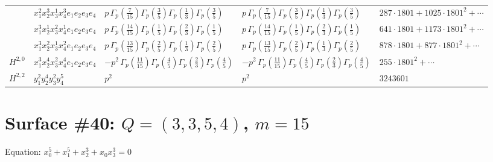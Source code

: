 \documentclass[11pt]{article}
\begin{document}
\begin{table}[ht]
{\begin{tabular}{@{}lllll@{}}
 & $x_{1}^{2} x_{2}^{3} x_{3}^{1} x_{4}^{3}  e_{1} e_{2} e_{3} e_{4}$ & $p \, \Gamma_p \left( \frac{7}{15} \right) \Gamma_p \left( \frac{3}{5} \right) \Gamma_p \left( \frac{1}{3} \right) \Gamma_p \left( \frac{3}{5} \right)$ & $p \, \Gamma_p \left( \frac{7}{15} \right) \Gamma_p \left( \frac{3}{5} \right) \Gamma_p \left( \frac{1}{3} \right) \Gamma_p \left( \frac{3}{5} \right)$ & $287{\cdot}1801{+}1025{\cdot}1801^{2}{+}\cdots$ \\
 & $x_{1}^{3} x_{2}^{1} x_{3}^{2} x_{4}^{1}  e_{1} e_{2} e_{3} e_{4}$ & $p \, \Gamma_p \left( \frac{14}{15} \right) \Gamma_p \left( \frac{1}{5} \right) \Gamma_p \left( \frac{2}{3} \right) \Gamma_p \left( \frac{1}{5} \right)$ & $p \, \Gamma_p \left( \frac{14}{15} \right) \Gamma_p \left( \frac{1}{5} \right) \Gamma_p \left( \frac{2}{3} \right) \Gamma_p \left( \frac{1}{5} \right)$ & $641{\cdot}1801{+}1173{\cdot}1801^{2}{+}\cdots$ \\
 & $x_{1}^{3} x_{2}^{2} x_{3}^{1} x_{4}^{2}  e_{1} e_{2} e_{3} e_{4}$ & $p \, \Gamma_p \left( \frac{13}{15} \right) \Gamma_p \left( \frac{2}{5} \right) \Gamma_p \left( \frac{1}{3} \right) \Gamma_p \left( \frac{2}{5} \right)$ & $p \, \Gamma_p \left( \frac{13}{15} \right) \Gamma_p \left( \frac{2}{5} \right) \Gamma_p \left( \frac{1}{3} \right) \Gamma_p \left( \frac{2}{5} \right)$ & $878{\cdot}1801{+}877{\cdot}1801^{2}{+}\cdots$ \\
\midrule
$H^{2,0}$ & $x_{1}^{3} x_{2}^{4} x_{3}^{2} x_{4}^{4}  e_{1} e_{2} e_{3} e_{4}$ & $- p^{2} \, \Gamma_p \left( \frac{11}{15} \right) \Gamma_p \left( \frac{4}{5} \right) \Gamma_p \left( \frac{2}{3} \right) \Gamma_p \left( \frac{4}{5} \right)$ & $- p^{2} \, \Gamma_p \left( \frac{11}{15} \right) \Gamma_p \left( \frac{4}{5} \right) \Gamma_p \left( \frac{2}{3} \right) \Gamma_p \left( \frac{4}{5} \right)$ & $255{\cdot}1801^{2}{+}\cdots$ \\
\midrule
$H^{2,2}$ & $y_{1}^{2} y_{2}^{4} y_{3}^{2} y_{4}^{5}$ & $p^{2} \,$ & $p^{2} \,$ & $3243601$ \\
\bottomrule
\end{tabular}
}
\renewcommand{\arraystretch}{1.0}
\end{table}

\newpage

\section*{Surface \#40: $Q=(3, 3, 5, 4)$, $m=15$}

Equation: $x_0^{5} + x_1^{5} + x_2^{3} + x_0 x_3^{3} = 0$
\end{document}
